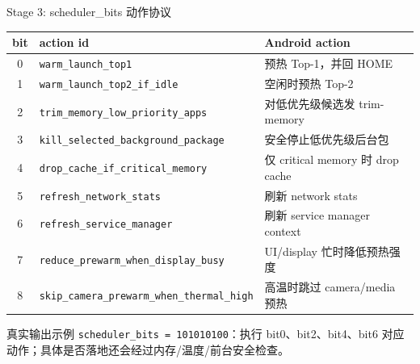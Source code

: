 \documentclass[UTF8,aspectratio=169,10pt]{ctexbeamer}
\newcommand{\code}[1]{\texttt{\small #1}}
\begin{document}
\begin{frame}{Stage 3: scheduler\_bits 动作协议}
  \scriptsize
  \begin{tabular}{cll}
    \toprule
    bit & action id & Android action \\
    \midrule
    0 & \code{warm\_launch\_top1} & 预热 Top-1，并回 HOME \\
    1 & \code{warm\_launch\_top2\_if\_idle} & 空闲时预热 Top-2 \\
    2 & \code{trim\_memory\_low\_priority\_apps} & 对低优先级候选发 trim-memory \\
    3 & \code{kill\_selected\_background\_package} & 安全停止低优先级后台包 \\
    4 & \code{drop\_cache\_if\_critical\_memory} & 仅 critical memory 时 drop cache \\
    5 & \code{refresh\_network\_stats} & 刷新 network stats \\
    6 & \code{refresh\_service\_manager} & 刷新 service manager context \\
    7 & \code{reduce\_prewarm\_when\_display\_busy} & UI/display 忙时降低预热强度 \\
    8 & \code{skip\_camera\_prewarm\_when\_thermal\_high} & 高温时跳过 camera/media 预热 \\
    \bottomrule
  \end{tabular}
  \vspace{0.4em}
  \begin{block}{真实输出示例}
    \code{scheduler\_bits = 101010100}：执行 bit0、bit2、bit4、bit6 对应动作；具体是否落地还会经过内存/温度/前台安全检查。
  \end{block}
\end{frame}
\end{document}
